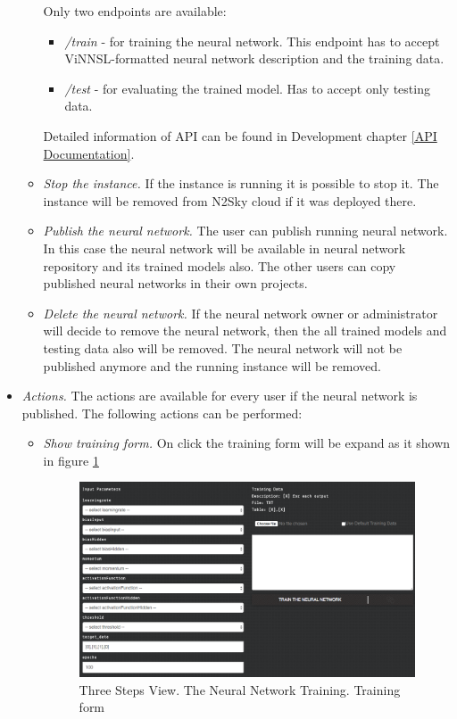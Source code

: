 \begin{itemize}
\begin{itemize}
Only two endpoints are available:
\begin{itemize}
\item \emph{/train} - for training the neural network. This endpoint has to accept ViNNSL-formatted neural network description and the training data. 
\item \emph{/test} - for evaluating the trained model. Has to accept only testing data.
\end{itemize}
Detailed information of API can be found in Development chapter \autoref{API Documentation}.
\item \emph{Stop the instance.} If the instance is running it is possible to stop it. The instance will be removed from N2Sky cloud if it was deployed there.
\item \emph{Publish the neural network.} The user can publish running neural network. In this case the neural network will be available in neural network repository and its trained models also. The other users can copy published neural networks in their own projects. 
\item \emph{Delete the neural network.} If the neural network owner or administrator will decide to remove the neural network, then the all trained models and testing data also will be removed. The neural network will not be published anymore and the running instance will be removed.
\end{itemize}
\item \emph{Actions.} The actions are available for every user if the neural network is published. The following actions can be performed:
\begin{itemize}
\item \emph{Show training form.} On click the training form will be expand as it shown in figure \ref{fig:expand_training_form}

\begin{figure}[htbp]
\begin{center}
  \includegraphics[width=\linewidth]{components/5/img/expand_training_form.png}
  \caption{Three Steps View. The Neural Network Training. Training form}
  \label{fig:expand_training_form}
\end{center}
\end{figure}


\end{itemize}
\end{itemize}
